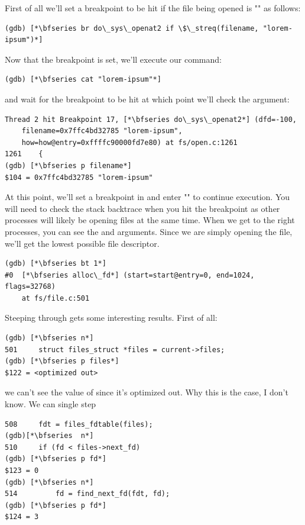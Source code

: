 First of all we'll set a breakpoint to be hit if the file being opened is "" as follows:

\begin{lstlisting}
(gdb) [*\bfseries br do\_sys\_openat2 if \$\_streq(filename, "lorem-ipsum")*]
\end{lstlisting}

\noindent
Now that the breakpoint is set, we'll execute our command:

\begin{lstlisting}
(gdb) [*\bfseries cat "lorem-ipsum"*]
\end{lstlisting}

\noindent
and wait for the breakpoint to be hit at which point we'll check the  argument:

\begin{lstlisting}
Thread 2 hit Breakpoint 17, [*\bfseries do\_sys\_openat2*] (dfd=-100, 
    filename=0x7ffc4bd32785 "lorem-ipsum", 
    how=how@entry=0xffffc90000fd7e80) at fs/open.c:1261
1261	{
(gdb) [*\bfseries p filename*]
$104 = 0x7ffc4bd32785 "lorem-ipsum"
\end{lstlisting}

\noindent
At this point, we'll set a breakpoint in  and enter "" to continue execution. You will need to check the stack backtrace when you hit the breakpoint as other processes will likely be opening files at the same time. When we get to the right processes, you can see the  and  arguments. Since we are simply opening the file, we'll get the lowest possible file descriptor.

\begin{lstlisting}
(gdb) [*\bfseries bt 1*]
#0  [*\bfseries alloc\_fd*] (start=start@entry=0, end=1024, flags=32768) 
    at fs/file.c:501
\end{lstlisting}

\noindent
Steeping through  gets some interesting results. First of all:

\begin{lstlisting}
(gdb) [*\bfseries n*]
501		struct files_struct *files = current->files;
(gdb) [*\bfseries p files*]
$122 = <optimized out>
\end{lstlisting}

\noindent
we can't see the value of  since it's optimized out. Why this is the case, I don't know. We can single step

\begin{lstlisting}
508		fdt = files_fdtable(files);
(gdb)[*\bfseries  n*]
510		if (fd < files->next_fd)
(gdb) [*\bfseries p fd*]
$123 = 0
(gdb) [*\bfseries n*]
514			fd = find_next_fd(fdt, fd);
(gdb) [*\bfseries p fd*]
$124 = 3
\end{lstlisting}

